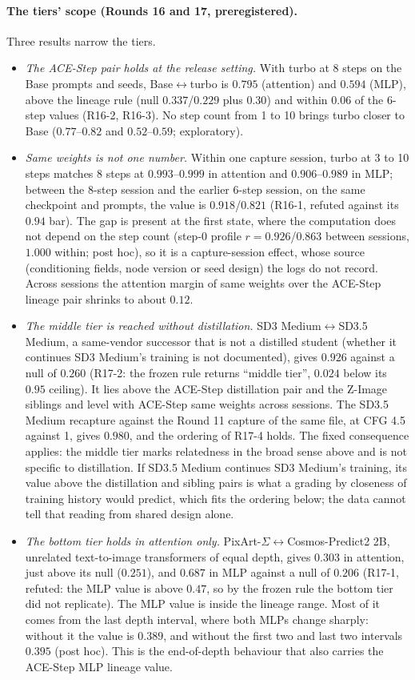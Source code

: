 \documentclass[11pt]{article}
\begin{document}
\paragraph{The tiers' scope (Rounds 16 and 17, preregistered).} Three results narrow the tiers.
\begin{itemize}
 \item \emph{The ACE-Step pair holds at the release setting.} With turbo at 8 steps on the Base prompts and seeds, Base$\leftrightarrow$turbo is $0.795$ (attention) and $0.594$ (MLP), above the lineage rule (null $0.337$/$0.229$ plus $0.30$) and within $0.06$ of the 6-step values (R16-2, R16-3). No step count from 1 to 10 brings turbo closer to Base ($0.77$--$0.82$ and $0.52$--$0.59$; exploratory).
 \item \emph{Same weights is not one number.} Within one capture session, turbo at 3 to 10 steps matches 8 steps at $0.993$--$0.999$ in attention and $0.906$--$0.989$ in MLP; between the 8-step session and the earlier 6-step session, on the same checkpoint and prompts, the value is $0.918$/$0.821$ (R16-1, refuted against its $0.94$ bar). The gap is present at the first state, where the computation does not depend on the step count (step-0 profile $r=0.926$/$0.863$ between sessions, $1.000$ within; post hoc), so it is a capture-session effect, whose source (conditioning fields, node version or seed design) the logs do not record. Across sessions the attention margin of same weights over the ACE-Step lineage pair shrinks to about $0.12$.
 \item \emph{The middle tier is reached without distillation.} SD3 Medium$\leftrightarrow$SD3.5 Medium, a same-vendor successor that is not a distilled student (whether it continues SD3 Medium's training is not documented), gives $0.926$ against a null of $0.260$ (R17-2: the frozen rule returns ``middle tier'', $0.024$ below its $0.95$ ceiling). It lies above the ACE-Step distillation pair and the Z-Image siblings and level with ACE-Step same weights across sessions. The SD3.5 Medium recapture against the Round 11 capture of the same file, at CFG 4.5 against 1, gives $0.980$, and the ordering of R17-4 holds. The fixed consequence applies: the middle tier marks relatedness in the broad sense above and is not specific to distillation. If SD3.5 Medium continues SD3 Medium's training, its value above the distillation and sibling pairs is what a grading by closeness of training history would predict, which fits the ordering below; the data cannot tell that reading from shared design alone.
 \item \emph{The bottom tier holds in attention only.} PixArt-$\Sigma$$\leftrightarrow$Cosmos-Predict2 2B, unrelated text-to-image transformers of equal depth, gives $0.303$ in attention, just above its null ($0.251$), and $0.687$ in MLP against a null of $0.206$ (R17-1, refuted: the MLP value is above $0.47$, so by the frozen rule the bottom tier did not replicate). The MLP value is inside the lineage range. Most of it comes from the last depth interval, where both MLPs change sharply: without it the value is $0.389$, and without the first two and last two intervals $0.395$ (post hoc). This is the end-of-depth behaviour that also carries the ACE-Step MLP lineage value.
\end{itemize}
\end{document}
